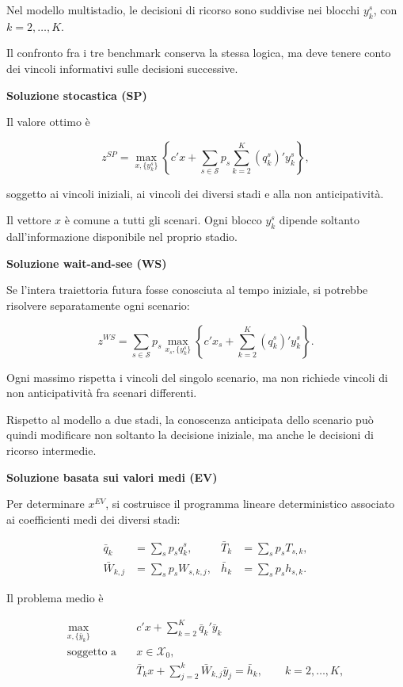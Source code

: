 Nel modello multistadio, le decisioni di ricorso
sono suddivise nei blocchi $y_k^s$,
con $k=2,\ldots,K$.

Il confronto fra i tre benchmark conserva
la stessa logica, ma deve tenere conto
dei vincoli informativi sulle decisioni successive.

\medskip

\noindent
\textbf{Soluzione stocastica (SP)}

Il valore ottimo \`e

\[
z^{SP}
=
\max_{x,\{y_k^s\}}
\left\{
c'x+
\sum_{s\in\mathcal S}p_s
\sum_{k=2}^{K}(q_k^s)'y_k^s
\right\},
\]

\noindent soggetto ai vincoli iniziali,
ai vincoli dei diversi stadi
e alla non anticipativit\`a.

Il vettore $x$ \`e comune a tutti
gli scenari. Ogni blocco $y_k^s$
dipende soltanto dall'informazione
disponibile nel proprio stadio.

\medskip

\noindent
\textbf{Soluzione wait-and-see (WS)}

Se l'intera traiettoria futura fosse
conosciuta al tempo iniziale, si potrebbe
risolvere separatamente ogni scenario:

\[
z^{WS}
=
\sum_{s\in\mathcal S}p_s
\max_{x_s,\{y_k^s\}}
\left\{
c'x_s+
\sum_{k=2}^{K}(q_k^s)'y_k^s
\right\}.
\]

Ogni massimo rispetta i vincoli
del singolo scenario, ma non richiede
vincoli di non anticipativit\`a
fra scenari differenti.

Rispetto al modello a due stadi,
la conoscenza anticipata dello scenario
pu\`o quindi modificare non soltanto
la decisione iniziale, ma anche
le decisioni di ricorso intermedie.

\medskip

\noindent
\textbf{Soluzione basata sui valori medi (EV)}

Per determinare $x^{EV}$, si costruisce
il programma lineare deterministico
associato ai coefficienti medi
dei diversi stadi:

\[
\begin{aligned}
\bar q_k
&=
\sum_s p_s q_k^s,
&
\bar T_k
&=
\sum_s p_s T_{s,k},
\\[4pt]
\bar W_{k,j}
&=
\sum_s p_s W_{s,k,j},
&
\bar h_k
&=
\sum_s p_s h_{s,k}.
\end{aligned}
\]

Il problema medio \`e

\[
\begin{aligned}
\max_{x,\{\bar y_k\}}
\quad&
c'x+\sum_{k=2}^{K}\bar q_k'\bar y_k
\\[4pt]
\text{soggetto a}\quad&
x\in\mathcal X_0,
\\[4pt]
&
\bar T_kx+
\sum_{j=2}^{k}\bar W_{k,j}\bar y_j
=
\bar h_k,
\qquad k=2,\ldots,K,
\end{aligned}
\]

